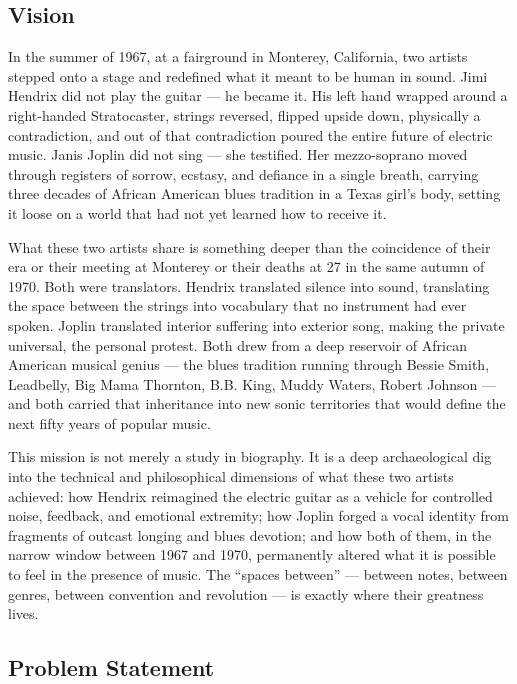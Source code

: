 \documentclass[11pt,letterpaper]{article}
\begin{document}
\subsection{Vision}

In the summer of 1967, at a fairground in Monterey, California, two artists stepped onto a stage and redefined what it meant to be human in sound. Jimi Hendrix did not play the guitar --- he became it. His left hand wrapped around a right-handed Stratocaster, strings reversed, flipped upside down, physically a contradiction, and out of that contradiction poured the entire future of electric music. Janis Joplin did not sing --- she testified. Her mezzo-soprano moved through registers of sorrow, ecstasy, and defiance in a single breath, carrying three decades of African American blues tradition in a Texas girl's body, setting it loose on a world that had not yet learned how to receive it.

What these two artists share is something deeper than the coincidence of their era or their meeting at Monterey or their deaths at 27 in the same autumn of 1970. Both were translators. Hendrix translated silence into sound, translating the space between the strings into vocabulary that no instrument had ever spoken. Joplin translated interior suffering into exterior song, making the private universal, the personal protest. Both drew from a deep reservoir of African American musical genius --- the blues tradition running through Bessie Smith, Leadbelly, Big Mama Thornton, B.B. King, Muddy Waters, Robert Johnson --- and both carried that inheritance into new sonic territories that would define the next fifty years of popular music.

This mission is not merely a study in biography. It is a deep archaeological dig into the technical and philosophical dimensions of what these two artists achieved: how Hendrix reimagined the electric guitar as a vehicle for controlled noise, feedback, and emotional extremity; how Joplin forged a vocal identity from fragments of outcast longing and blues devotion; and how both of them, in the narrow window between 1967 and 1970, permanently altered what it is possible to feel in the presence of music. The ``spaces between'' --- between notes, between genres, between convention and revolution --- is exactly where their greatness lives.

\subsection{Problem Statement}
\end{document}
